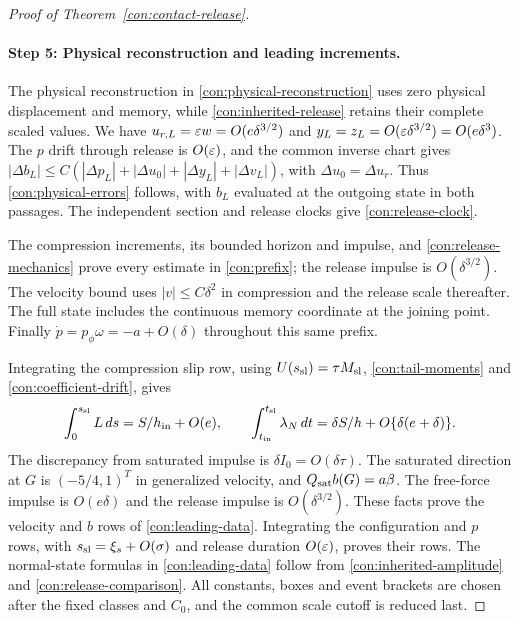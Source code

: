 \begin{proof}[Proof of Theorem~\ref{con:contact-release}]
\paragraph{Step 5: Physical reconstruction and leading increments.}
The physical reconstruction in \eqref{con:physical-reconstruction}
uses zero physical displacement and memory, while
\eqref{con:inherited-release} retains their complete scaled values.
We have $u_{r,L}=\varepsilon w=O(e\delta^{3/2})$ and
$y_L=z_L=O(\varepsilon\delta^{3/2})=O(e\delta^3)$.
The $p$ drift through release is $O(\varepsilon)$, and the common inverse
chart gives
$|\Delta b_L|\le C(|\Delta p_L|+|\Delta u_0|+|\Delta y_L|+
|\Delta v_L|)$, with $\Delta u_0=\Delta u_r$.
Thus \eqref{con:physical-errors} follows, with $b_L$ evaluated at
the outgoing state in both passages.  The independent section and
release clocks give \eqref{con:release-clock}.

The compression increments, its bounded horizon and impulse, and
\eqref{con:release-mechanics} prove every estimate in
\eqref{con:prefix}; the release impulse is $O(\delta^{3/2})$.
The velocity bound uses $|v|\le C\delta^2$ in compression and the
release scale thereafter.  The full state includes the continuous
memory coordinate at the joining point.  Finally
$\dot p=p_\phi\omega=-a+O(\delta)$ throughout this same prefix.

Integrating the compression slip row, using $U(s_{\rm sl})=\tau M_{\rm sl}$,
\eqref{con:tail-moments} and \eqref{con:coefficient-drift}, gives
\begin{equation}
 \int_0^{s_{\rm sl}}L\,ds=S/h_{\rm in}+O(e),\qquad
 \int_{t_{\rm in}}^{t_{\rm sl}}\lambda_N\,dt
   =\delta S/h+O\{\delta(e+\delta)\}.
 \label{con:compression-impulse}
\end{equation}
The discrepancy from saturated impulse is $\delta I_0=O(\delta\tau)$.
The saturated direction at $G$ is $(-5/4,1)^T$ in generalized
velocity, and $Q_{\rm sat}b(G)=a\beta$.
The free-force impulse is $O(e\delta)$ and the release impulse is
$O(\delta^{3/2})$.  These facts prove the velocity and $b$ rows of
\eqref{con:leading-data}.  Integrating the configuration and $p$ rows,
with $s_{\rm sl}=\xi_s+O(\sigma)$ and release duration $O(\varepsilon)$, proves
their rows.  The normal-state formulas in \eqref{con:leading-data} follow from
\eqref{con:inherited-amplitude} and \eqref{con:release-comparison}.
All constants, boxes and event brackets are chosen after the fixed
classes and $C_0$, and the common scale cutoff is reduced last.
\end{proof}


